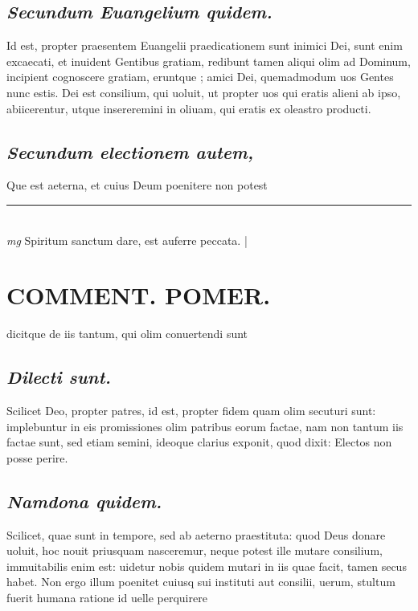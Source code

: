\documentclass{article}
\begin{document}
\begin{pages}
\subsection*{\textit{Secundum Euangelium quidem. }}\pstart Id est, propter praesentem Euangelii praedicationem sunt inimici Dei, sunt enim excaecati, et inuident Gentibus gratiam, redibunt tamen aliqui olim ad Dominum, incipient cognoscere gratiam, eruntque ; amici Dei, quemadmodum uos Gentes nunc estis. Dei est consilium, qui uoluit, ut propter uos qui eratis alieni ab ipso, abiicerentur, utque insereremini in oliuam, qui eratis ex oleastro producti.  \pend
{}
{}
\subsection*{\textit{Secundum electionem autem, }}\pstart Que est aeterna, et cuius Deum poenitere non potest  \pend
\vspace{0.5cm}\noindent
\vspace{0.2cm}\rule{1cm}{0.2pt}\\ 
\hspace{0.2cm}\textit{mg}
\footnotesize Spiritum sanctum dare, est auferre peccata.  
\normalsize| 
\section*{COMMENT. POMER.  }\pstart dicitque de iis tantum, qui olim conuertendi sunt\pend
{}
{}
\subsection*{\textit{Dilecti sunt. }}\pstart Scilicet Deo, propter patres, id est, propter fidem quam olim secuturi sunt: implebuntur in eis promissiones olim patribus eorum factae, nam non tantum iis factae sunt, sed etiam semini, ideoque clarius exponit, quod dixit: Electos non posse perire.   \pend
{}
{}
\subsection*{\textit{Namdona quidem. }}\pstart Scilicet, quae sunt in tempore, sed ab aeterno praestituta: quod Deus donare uoluit, hoc nouit priusquam nasceremur, neque potest ille mutare consilium, immuitabilis enim est: uidetur nobis quidem mutari in iis quae facit, tamen secus habet. Non ergo illum poenitet cuiusq sui instituti aut consilii, uerum, stultum fuerit humana ratione id uelle perquirere\pend
{}
{}

\end{pages}
\end{document}
